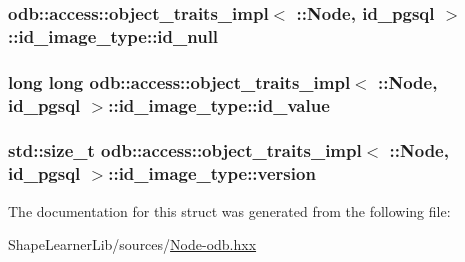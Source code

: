 \subsubsection[{id\+\_\+null}]{ odb\+::access\+::object\+\_\+traits\+\_\+impl$<$ \+::{\bf Node}, id\+\_\+pgsql $>$\+::id\+\_\+image\+\_\+type\+::id\+\_\+null}\label{structodb_1_1access_1_1object__traits__impl_3_01_1_1_node_00_01id__pgsql_01_4_1_1id__image__type_a9ca859ea30d86f8459dd87b1cf73a2c5}
\hypertarget{structodb_1_1access_1_1object__traits__impl_3_01_1_1_node_00_01id__pgsql_01_4_1_1id__image__type_a30ace8e2291763d5253f693c2c41833b}{}
\subsubsection[{id\+\_\+value}]{\setlength{\rightskip}{0pt plus 5cm}long long odb\+::access\+::object\+\_\+traits\+\_\+impl$<$ \+::{\bf Node}, id\+\_\+pgsql $>$\+::id\+\_\+image\+\_\+type\+::id\+\_\+value}\label{structodb_1_1access_1_1object__traits__impl_3_01_1_1_node_00_01id__pgsql_01_4_1_1id__image__type_a30ace8e2291763d5253f693c2c41833b}
\hypertarget{structodb_1_1access_1_1object__traits__impl_3_01_1_1_node_00_01id__pgsql_01_4_1_1id__image__type_a46b25efede2167b0d2917d57c8228c01}{}
\subsubsection[{version}]{\setlength{\rightskip}{0pt plus 5cm}std\+::size\+\_\+t odb\+::access\+::object\+\_\+traits\+\_\+impl$<$ \+::{\bf Node}, id\+\_\+pgsql $>$\+::id\+\_\+image\+\_\+type\+::version}\label{structodb_1_1access_1_1object__traits__impl_3_01_1_1_node_00_01id__pgsql_01_4_1_1id__image__type_a46b25efede2167b0d2917d57c8228c01}


The documentation for this struct was generated from the following file\+:\begin{DoxyCompactItemize}
\item 
Shape\+Learner\+Lib/sources/\hyperlink{_node-odb_8hxx}{Node-\/odb.\+hxx}\end{DoxyCompactItemize}
